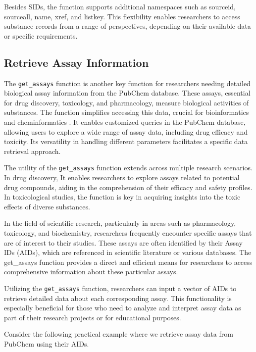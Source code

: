 Besides SIDs, the function supports additional namespaces such as sourceid, sourceall, name, xref, and listkey. This flexibility enables researchers to access substance records from a range of perspectives, depending on their available data or specific requirements.

\hypertarget{retrieve-assay-information}{%
\subsection{Retrieve Assay Information}\label{retrieve-assay-information}}

The \texttt{get\_assays} function is another key function for researchers needing detailed biological assay information from the PubChem database. These assays, essential for drug discovery, toxicology, and pharmacology, measure biological activities of substances. The function simplifies accessing this data, crucial for bioinformatics and cheminformatics \citep{korkmaz2020deep, yamasan2024binding}. It enables customized queries in the PubChem database, allowing users to explore a wide range of assay data, including drug efficacy and toxicity. Its versatility in handling different parameters facilitates a specific data retrieval approach.

The utility of the \texttt{get\_assays} function extends across multiple research scenarios. In drug discovery, It enables researchers to explore assays related to potential drug compounds, aiding in the comprehension of their efficacy and safety profiles. In toxicological studies, the function is key in acquiring insights into the toxic effects of diverse substances.

In the field of scientific research, particularly in areas such as pharmacology, toxicology, and biochemistry, researchers frequently encounter specific assays that are of interest to their studies. These assays are often identified by their Assay IDs (AIDs), which are referenced in scientific literature or various databases. The get\_assays function provides a direct and efficient means for researchers to access comprehensive information about these particular assays.

Utilizing the \texttt{get\_assays} function, researchers can input a vector of AIDs to retrieve detailed data about each corresponding assay. This functionality is especially beneficial for those who need to analyze and interpret assay data as part of their research projects or for educational purposes.

Consider the following practical example where we retrieve assay data from PubChem using their AIDs.


